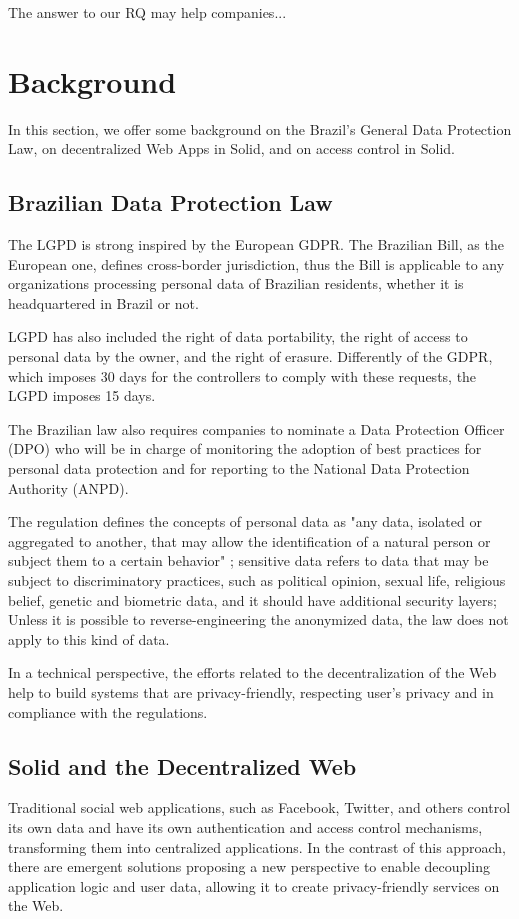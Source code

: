 \documentclass[sigconf]{acmart}
\begin{document}
The answer to our RQ may help companies...


\section{Background}
In this section, we offer some background on the Brazil's General Data Protection Law, on decentralized Web Apps in Solid, and on access control in Solid.

\subsection{Brazilian Data Protection Law}
The LGPD is strong inspired by the European GDPR. The Brazilian Bill, as the European one, defines cross-border jurisdiction, thus the Bill is applicable to any organizations processing personal data of Brazilian residents, whether it is headquartered in Brazil or not.

LGPD has also included the right of data portability, the right of access to personal data by the owner, and the right of erasure. Differently of the GDPR, which imposes 30 days for the controllers to comply with these requests, the LGPD imposes 15 days.

The Brazilian law also requires companies to nominate a Data Protection Officer (DPO) who will be in charge of monitoring the adoption of best practices for personal data protection and for reporting to the National Data Protection Authority (ANPD).

The regulation defines the concepts of personal data as "any data, isolated or aggregated to another, that may allow the identification of a natural person or subject them to a certain behavior" \cite{iapp2018}; sensitive data refers to data that may be subject to discriminatory practices, such as political opinion, sexual life, religious belief, genetic and biometric data, and it should have additional security layers; Unless it is possible to reverse-engineering the anonymized data, the law does not apply to this kind of data.

In a technical perspective, the efforts related to the decentralization of the Web help to build systems that are privacy-friendly, respecting user's privacy and in compliance with the regulations.

\subsection{Solid and the Decentralized Web}
Traditional social web applications, such as Facebook, Twitter, and others control its own data and have its own authentication and access control mechanisms, transforming them into centralized applications. In the contrast of this approach, there are emergent solutions proposing a new perspective to enable decoupling application logic and user data, allowing it to create privacy-friendly services on the Web.
\end{document}
